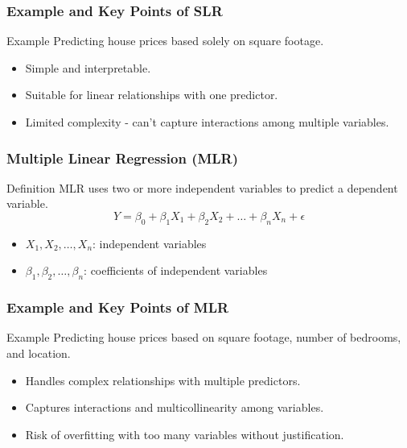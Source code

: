 \documentclass[aspectratio=169]{beamer}
\begin{document}
\begin{frame}[fragile]
    \frametitle{Example and Key Points of SLR}
    \begin{block}{Example}
        Predicting house prices based solely on square footage.
    \end{block}
    \begin{itemize}
        \item Simple and interpretable.
        \item Suitable for linear relationships with one predictor.
        \item Limited complexity - can't capture interactions among multiple variables.
    \end{itemize}
\end{frame}

\begin{frame}[fragile]
    \frametitle{Multiple Linear Regression (MLR)}
    \begin{block}{Definition}
        MLR uses two or more independent variables to predict a dependent variable.
        \begin{equation}
            Y = \beta_0 + \beta_1 X_1 + \beta_2 X_2 + \ldots + \beta_n X_n + \epsilon
        \end{equation}
    \end{block}
    \begin{itemize}
        \item \( X_1, X_2, \ldots, X_n \): independent variables
        \item \( \beta_1, \beta_2, \ldots, \beta_n \): coefficients of independent variables
    \end{itemize}
\end{frame}

\begin{frame}[fragile]
    \frametitle{Example and Key Points of MLR}
    \begin{block}{Example}
        Predicting house prices based on square footage, number of bedrooms, and location.
    \end{block}
    \begin{itemize}
        \item Handles complex relationships with multiple predictors.
        \item Captures interactions and multicollinearity among variables.
        \item Risk of overfitting with too many variables without justification.
    \end{itemize}
\end{frame}
\end{document}
